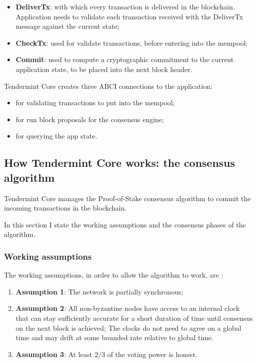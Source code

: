 \documentclass[]{article}
\begin{document}
\begin{itemize}
	\item \textbf{DeliverTx}: with which every transaction is delivered in the blockchain. Application needs to validate each transaction received with the DeliverTx message against the current state;
	\item \textbf{CheckTx}: used for validate transactions, before entering into the mempool;
	\item \textbf{Commit}: used to compute a cryptographic commitment to the current application state, to be placed into the next block header.
\end{itemize}

Tendermint Core creates three ABCI connections to the application:
\begin{itemize}
	\item for validating transactions to put into the mempool;
	\item for run block proposals for the consensus engine;
	\item for querying the app state.
\end{itemize}

\subsection{How Tendermint Core works: the consensus algorithm}
Tendermint Core manages the Proof-of-Stake consensus algorithm to commit the incoming transactions in the blockchain. 

In this section I state the working assumptions and the consensus phases of the algorithm.

\subsubsection{Working assumptions}

The working assumptions, in order to allow the algorithm to work, are \cite[Section 6.1: On Byzantine Consensus]{tpaper}:
\begin{enumerate}
	\item \textbf{Assumption 1}: The network is partially synchronous;
	\item \textbf{Assumption 2}: All non-byzantine nodes have access to an internal clock that can stay sufficiently accurate for a short duration of time until consensus on the next block is achieved; The clocks do not need to agree on a global time and may drift at some bounded rate relative to global time.
	\item \textbf{Assumption 3}: At least $2/3$ of the voting power is honest.
\end{enumerate}
\end{document}
